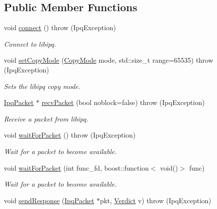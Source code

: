 \subsection*{\-Public \-Member \-Functions}
\begin{DoxyCompactItemize}
\item 
void \hyperlink{classIPQ_1_1IpqSocket_aaf97b48f357008b4858605d94a37cd1e}{connect} ()  throw (\-Ipq\-Exception)
\begin{DoxyCompactList}\small\item\em \-Connect to libipq. \end{DoxyCompactList}\item 
void \hyperlink{classIPQ_1_1IpqSocket_abec3b30403b9763467cb66cd5e8bbfe4}{set\-Copy\-Mode} (\hyperlink{classIPQ_1_1IpqSocket_afee6d75480079906ecf6544f8467e0cc}{\-Copy\-Mode} mode, std\-::size\-\_\-t range=65535)  throw (\-Ipq\-Exception)
\begin{DoxyCompactList}\small\item\em \-Sets the libipq copy mode. \end{DoxyCompactList}\item 
\hyperlink{classIPQ_1_1IpqPacket}{\-Ipq\-Packet} $\ast$ \hyperlink{classIPQ_1_1IpqSocket_aff35b95d33b21474f844660fef28938c}{recv\-Packet} (bool noblock=false)  throw (\-Ipq\-Exception)
\begin{DoxyCompactList}\small\item\em \-Receive a packet from libipq. \end{DoxyCompactList}\item 
void \hyperlink{classIPQ_1_1IpqSocket_a123e77a47324d0c765e191153659c040}{wait\-For\-Packet} ()  throw (\-Ipq\-Exception)
\begin{DoxyCompactList}\small\item\em \-Wait for a packet to become available. \end{DoxyCompactList}\item 
void \hyperlink{classIPQ_1_1IpqSocket_a32af8892fbf20202f4265a771d06bb3a}{wait\-For\-Packet} (int func\-\_\-fd, boost\-::function$<$ void()$>$ func)
\begin{DoxyCompactList}\small\item\em \-Wait for a packet to become available. \end{DoxyCompactList}\item 
void \hyperlink{classIPQ_1_1IpqSocket_a53e0f4e45363cbcd919a2d96ee7cf0a8}{send\-Response} (\hyperlink{classIPQ_1_1IpqPacket}{\-Ipq\-Packet} $\ast$pkt, \hyperlink{classIPQ_1_1IpqSocket_a2aaaf01ab3bdb3a4a7f90dd142fd93cc}{\-Verdict} v)  throw (\-Ipq\-Exception)

\end{DoxyCompactItemize}

